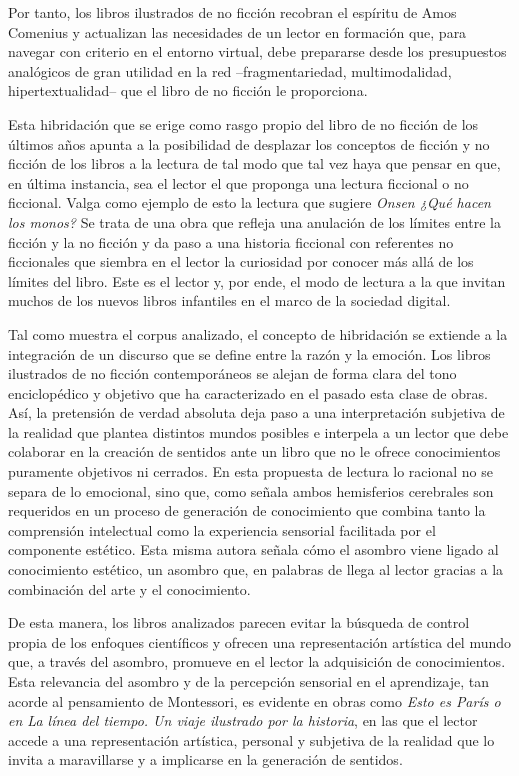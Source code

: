 \documentclass[spanish]{textolivre}
\begin{document}
Por tanto, los libros ilustrados de no ficción recobran el espíritu de Amos Comenius y actualizan las necesidades de un lector en formación que, para navegar con criterio en el entorno virtual, debe prepararse desde los presupuestos analógicos de gran utilidad en la red --fragmentariedad, multimodalidad, hipertextualidad-- que el libro de no ficción le proporciona.

Esta hibridación que se erige como rasgo propio del libro de no ficción de los últimos años apunta a la posibilidad de desplazar los conceptos de ficción y no ficción de los libros a la lectura de tal modo que tal vez haya que pensar en que, en última instancia, sea el lector el que proponga una lectura ficcional o no ficcional. Valga como ejemplo de esto la lectura que sugiere \textit{Onsen ¿Qué hacen los monos?} Se trata de una obra que refleja una anulación de los límites entre la ficción y la no ficción y da paso a una historia ficcional con referentes no ficcionales que siembra en el lector la curiosidad por conocer más allá de los límites del libro. Este es el lector y, por ende, el modo de lectura a la que invitan muchos de los nuevos libros infantiles en el marco de la sociedad digital.

Tal como muestra el corpus analizado, el concepto de hibridación se extiende a la integración de un discurso que se define entre la razón y la emoción. Los libros ilustrados de no ficción contemporáneos se alejan de forma clara del tono enciclopédico y objetivo que ha caracterizado en el pasado esta clase de obras. Así, la pretensión de verdad absoluta deja paso a una interpretación subjetiva de la realidad que plantea distintos mundos posibles e interpela a un lector que debe colaborar en la creación de sentidos ante un libro que no le ofrece conocimientos puramente objetivos ni cerrados. En esta propuesta de lectura lo racional no se separa de lo emocional, sino que, como señala \textcite{grilli_beauty_2020b} ambos hemisferios cerebrales son requeridos en un proceso de generación de conocimiento que combina tanto la comprensión intelectual como la experiencia sensorial facilitada por el componente estético. Esta misma autora señala cómo el asombro viene ligado al conocimiento estético, un asombro que, en palabras de \textcite{montes_buscar_2018} llega al lector gracias a la combinación del arte y el conocimiento.

De esta manera, los libros analizados parecen evitar la búsqueda de control propia de los enfoques científicos y ofrecen una representación artística del mundo que, a través del asombro, promueve en el lector la adquisición de conocimientos. Esta relevancia del asombro y de la percepción sensorial en el aprendizaje, tan acorde al pensamiento de Montessori, es evidente en obras como \textit{Esto es París o en La línea del tiempo. Un viaje ilustrado por la historia}, en las que el lector accede a una representación artística, personal y subjetiva de la realidad que lo invita a maravillarse y a implicarse en la generación de sentidos.
\end{document}
